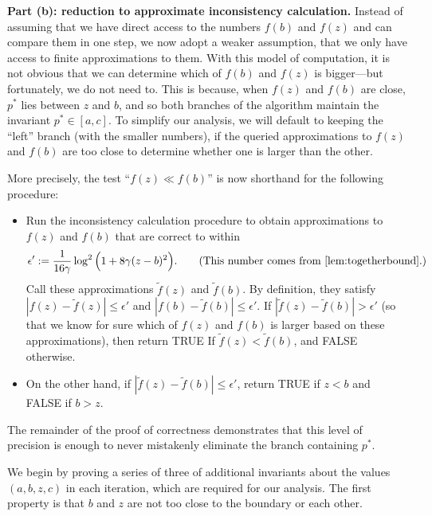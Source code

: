 \begin{lproof}
    \textbf{Part (b): reduction to approximate inconsistency calculation.}
    Instead of assuming that we have direct access to the numbers $f(b)$ and $f(z)$ and
    can compare them in one step, we now adopt a weaker assumption, that we only have
    access to finite approximations to them.
    With this model of computation, it is not obvious that we can determine which of $f(b)$ and $f(z)$ is bigger---but fortunately, we do not need to.
    This is because, when $f(z)$ and $f(b)$ are close, $p^*$ lies between $z$ and $b$, and so both branches of the algorithm maintain the invariant $p^* \in [a,c]$.
    To simplify our analysis, we will default to keeping the ``left'' branch (with the smaller numbers), if the queried approximations to $f(z)$ and $f(b)$ are too close to determine whether one is larger than the other.

    More precisely, the test ``$f(z) \ll f(b)$'' is now shorthand
    for the following procedure:
    \begin{itemize}
        \item
        Run the inconsistency calculation procedure to obtain
        approximations to $f(z)$ and $f(b)$ that are correct to within
        \begin{equation}
            \epsilon' :=
            \frac{1}{16 \gamma}
                    \log^2 \Big(
                         1 +  8 \gamma (z-b)^2
                     \Big).
            \qquad\text{(This number comes from \cref{lem:togetherbound}.)}
            \label{eq:query-precision}
        \end{equation}
        Call these approximations $\tilde f(z)$ and $\tilde f(b)$.
        By definition, they satisfy $|f(z) - \tilde f(z)| \le \epsilon'$ and $|f(b) - \tilde f(b)| \le \epsilon'$.
        If $|\tilde f(z) - \tilde f(b)| > \epsilon'$ (so that we know for sure which of $f(z)$ and $f(b)$ is larger based on these approximations), then return
        TRUE If $\tilde f(z) < \tilde f(b)$, and FALSE otherwise.
        \item
        On the other hand, if $|\tilde f(z) - \tilde f(b)| \le \epsilon'$,
        return TRUE if $z < b$ and FALSE if $b > z$.
    \end{itemize}

    The remainder of the proof of correctness demonstrates that this level of precision is enough to never mistakenly eliminate the branch containing $p^*$.
    
    We begin by proving a series of three of additional invariants about the values $(a,b,z,c)$ in each iteration, which are required for our analysis.
    The first property is
    that $b$ and $z$ are not too close to the boundary or each other.


\end{lproof}
